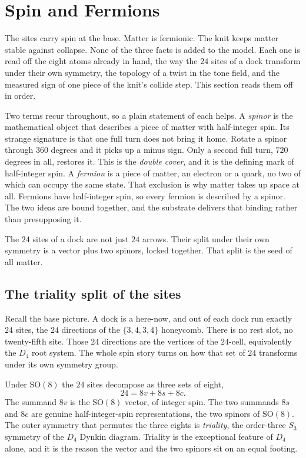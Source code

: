 \section{Spin and Fermions}

The sites carry spin at the base. Matter is fermionic. The knit keeps matter stable against collapse. None of
the three facts is added to the model. Each one is read off the eight atoms already in hand, the way the $24$
sites of a dock transform under their own symmetry, the topology of a twist in the tone field, and the measured
sign of one piece of the knit's collide step. This section reads them off in order.

Two terms recur throughout, so a plain statement of each helps. A \emph{spinor} is the mathematical object that
describes a piece of matter with half-integer spin. Its strange signature is that one full turn does not bring it
home. Rotate a spinor through $360$ degrees and it picks up a minus sign. Only a second full turn, $720$ degrees
in all, restores it. This is the \emph{double cover}, and it is the defining mark of half-integer spin. A
\emph{fermion} is a piece of matter, an electron or a quark, no two of which can occupy the same state. That
exclusion is why matter takes up space at all. Fermions have half-integer spin, so every fermion is described by
a spinor. The two ideas are bound together, and the substrate delivers that binding rather than presupposing it.

\begin{result}
The $24$ sites of a dock are not just $24$ arrows. Their split under their own symmetry is a vector plus two
spinors, locked together. That split is the seed of all matter.
\end{result}

\subsection{The triality split of the sites}

Recall the base picture. A dock is a here-now, and out of each dock run exactly $24$ sites, the $24$ directions
of the $\{3,4,3,4\}$ honeycomb. There is no rest slot, no twenty-fifth site. Those $24$ directions are the
vertices of the $24$-cell, equivalently the $D_4$ root system. The whole spin story turns on how that set of $24$
transforms under its own symmetry group.

Under $\mathrm{SO}(8)$ the $24$ sites decompose as three sets of eight,
\[
24 = 8v + 8s + 8c.
\]
The summand $8v$ is the $\mathrm{SO}(8)$ vector, of integer spin. The two summands $8s$ and $8c$ are genuine
half-integer-spin representations, the two spinors of $\mathrm{SO}(8)$. The outer symmetry that permutes the
three eights is \emph{triality}, the order-three $S_3$ symmetry of the $D_4$ Dynkin diagram. Triality is the
exceptional feature of $D_4$ alone, and it is the reason the vector and the two spinors sit on an equal footing.

